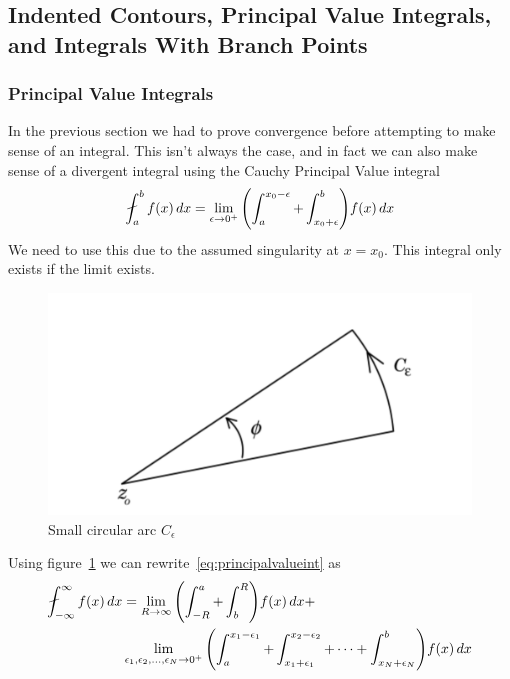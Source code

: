     \subsection{Indented Contours, Principal Value Integrals, and Integrals With
    Branch Points}
        \subsubsection{Principal Value Integrals}
        In the previous section we had to prove convergence before attempting to
        make sense of an integral. This isn't always the case, and in fact we
        can also make sense of a divergent integral using the Cauchy Principal
        Value integral
        \begin{align}\label{eq:principalvalueint}
            \fint_a^b f(x) \, dx = \lim_{\epsilon \to 0^+} \pren{
                \int_a^{x_0 - \epsilon} + \int_{x_0+\epsilon}^b
            } f(x) \, dx
        \end{align}
        We need to use this due to the assumed singularity at $x=x_0$. This
        integral only exists if the limit exists.
        \begin{figure}[H]
            \centering
            \includegraphics[scale=0.1]{./img/arc.png}
            \caption{Small circular arc $C_\epsilon$}
            \label{fig:arc}
        \end{figure}
        Using figure~\ref{fig:arc} we can rewrite~\eqref{eq:principalvalueint}
        as
        \begin{align*}
            \fint_{-\infty}^\infty f(x) \, dx &= \lim_{R\to\infty}
            \pren{\int_{-R}^a + \int_b^R} f(x) \, dx +\\
            &\lim_{\epsilon_1, \epsilon_2, \ldots, \epsilon_N \to 0^+}
            \pren{
                \int_{a}^{x_1-\epsilon_1} +
                \int_{x_1 + \epsilon_1}^{x_2-\epsilon_2} +
                \cdots +
                \int_{x_N + \epsilon_N}^{b}
            } f(x) \, dx
        \end{align*}
